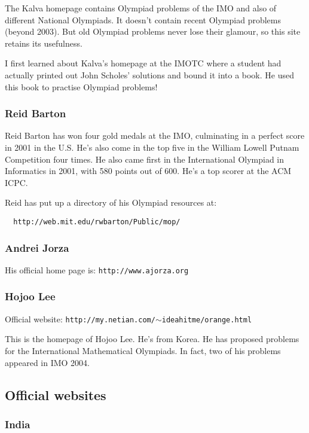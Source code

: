 \documentclass[a4paper]{amsart}
\begin{document}
The Kalva homepage contains Olympiad problems of the IMO and also of different National Olympiads. It doesn't contain recent
Olympiad problems (beyond 2003). But old Olympiad problems never lose their glamour, so this site retains its usefulness.

I first learned about Kalva's homepage at the IMOTC where a student had actually printed out John Scholes' solutions and bound it into
a book. He used this book to practise Olympiad problems!

\subsubsection{Reid Barton}

Reid Barton has won four gold medals at the IMO, culminating in a perfect score in 2001 in the U.S.  He's also come in the top
five in the William Lowell Putnam Competition four times. He also came first in the International Olympiad in Informatics in 2001,
with 580 points out of 600. He's a top scorer at the ACM ICPC.

Reid has put up a directory of his Olympiad resources at:

\begin{verbatim}
  http://web.mit.edu/rwbarton/Public/mop/
\end{verbatim}

\subsubsection{Andrei Jorza}

His official home page is: {\tt http://www.ajorza.org}

\subsubsection{Hojoo Lee}

Official website: {\tt http://my.netian.com/$\sim$ideahitme/orange.html}

This is the homepage of Hojoo Lee. He's from Korea. He has proposed problems for the International Mathematical Olympiads.
In fact, two of his problems appeared in IMO 2004.

\subsection{Official websites}

\subsubsection{India}
\end{document}
